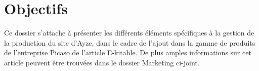 \section{Objectifs}

Ce dossier s'attache à présenter les différents éléments spécifiques à la
gestion de la production du site d'Ayze, dans le cadre de l'ajout dans la
gamme de produits de l'entreprise Picaso de l'article E-kitable.
De plus amples informations sur cet article peuvent être trouvées dans
le dossier Marketing ci-joint.

